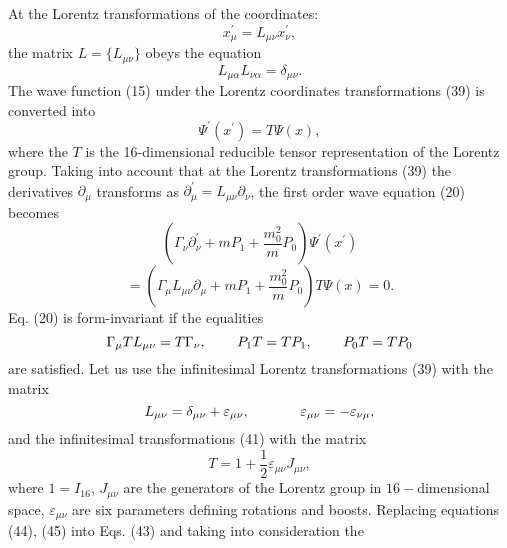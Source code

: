 \documentclass[a4paper,12pt]{article}
\begin{document}
At the Lorentz transformations of the coordinates:
\begin{equation}
x_\mu ^{\prime }=L_{\mu \nu }x_\nu ^{\prime } , \label{39}
\end{equation}
the matrix $L=\{L_{\mu \nu }\}$ obeys the equation
\begin{equation}
L_{\mu \alpha }L_{\nu \alpha }=\delta _{\mu \nu } . \label{40}
\end{equation}
The wave function (15) under the Lorentz coordinates
transformations (39) is converted into
\begin{equation}
\Psi ^{\prime }(x^{\prime })=T\Psi (x) , \label{41}
\end{equation}
where the $T$ is the 16-dimensional reducible tensor
representation of the Lorentz group. Taking into account that at
the Lorentz transformations (39) the derivatives $\partial _\mu $
transforms as $\partial _\mu ^{\prime }=L_{\mu \nu }\partial _\nu
$, the first order wave equation (20) becomes
\[
\left( \Gamma _\nu \partial _\nu^{\prime }
+mP_1+\frac{m_0^2}{m}P_0\right) \Psi^{\prime } (x^{\prime
})
\]
\vspace{-7mm}
\begin{equation}
\label{42}
\end{equation}
\vspace{-7mm}
\[
=\left( \Gamma _\mu L_{\mu\nu}\partial _\mu
 +mP_1+\frac{m_0^2}{m}P_0\right)T\Psi (x)=0 .
\]
Eq. (20) is form-invariant if the equalities
\begin{equation}
\Gamma _\mu TL_{\mu \nu }=T\Gamma _\nu , \hspace{0.3in}P_1 T=TP_1
, \hspace{0.3in}P_0 T=TP_0 \label{43}
\end{equation}
are satisfied. Let us use the infinitesimal Lorentz
transformations (39) with the matrix
\begin{equation}
L_{\mu \nu }=\delta _{\mu \nu }+\varepsilon _{\mu \nu } ,
\hspace{0.5in} \varepsilon _{\mu \nu }=-\varepsilon _{\nu \mu } ,
\label{44}
\end{equation}
and the infinitesimal transformations (41) with the matrix
\begin{equation}
T=1+\frac 12\varepsilon _{\mu \nu }J_{\mu \nu } , \label{45}
\end{equation}
where $1=I_{16}$, $J_{\mu \nu }$ are the generators of the Lorentz
group in $16-$dimensional space, $\varepsilon _{\mu \nu }$ are six
parameters defining rotations and boosts. Replacing equations
(44), (45) into Eqs. (43) and taking into consideration the
\end{document}

